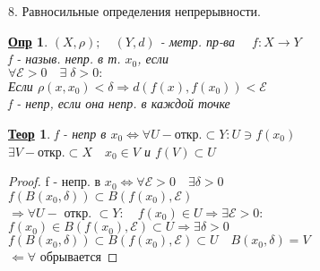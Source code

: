 \documentclass[12pt, fleqn]{article}
\newenvironment{question}[1]{\hspace*{-4em} #1}{\newpage}
\newcommand{\ra}{\Rightarrow}
\newcommand{\la}{\Leftarrow}
\newcommand{\rla}{\Leftrightarrow}
\newcommand{\q}{\quad}
\theoremstyle{nonumbermarginbreak}
\newtheorem{theorem}{\hspace*{-2em}\underline{\bfseries Теор}}[section]
\newtheorem{definition}{\hspace*{-2em}\underline{\bfseries Опр}}[section]
\newtheorem{proof}{\hspace*{-2em}\underline{\bfseries Док-во}}[section]
\begin{document}
    \begin{question}{8. Равносильные определения непрерывности.}
        \begin{definition} 
            $(X, \rho); \q (Y, d)$ - метр. пр-ва $\q f: X \rightarrow Y$\\
            f - назыв. непр. в т. $x_0$, если\\
            $\forall \mathcal{E} > 0 \q \exists \; \delta > 0 :$\\
            Если $\rho(x, x_0) < \delta \ra d(f(x), f(x_0)) < \mathcal{E}$\\
            f - непр, если она непр. в каждой точке
        \end{definition}

        \begin{theorem} 
            f - непр в $x_0 \rla \forall U - \text{откр.} \subset Y: U \ni f(x_0)$\\
            $\exists V - \text{откр.} \subset X \q x_0 \in V$ и $f(V) \subset U$
        \end{theorem}

        \begin{proof} 
            f - непр. в $x_0 \rla \forall \mathcal{E} > 0 \q \exists \delta > 0$\\
            $f(B(x_0, \delta)) \subset B(f(x_0), \mathcal{E})$\\
            $\ra \forall U -$ откр. $\subset Y: \q f(x_0) \in U \ra \exists \mathcal{E} > 0:$\\
            $f(x_0) \in B(f(x_0), \mathcal{E}) \subset U \ra \exists \delta > 0$ \\
            $f(B(x_0, \delta)) \subset B(f(x_0), \mathcal{E}) \subset U \q B(x_0, \delta) = V$\\
            $\la \forall$ обрывается
        \end{proof}
    \end{question}
\end{document}
